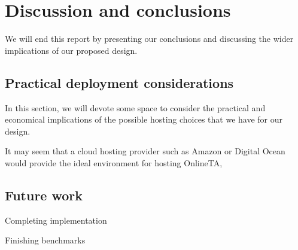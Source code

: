 \chapter{Discussion and conclusions}
We will end this report by presenting our conclusions and discussing
the wider implications of our proposed design.

\section{Practical deployment considerations}
In this section, we will devote some space to consider the practical
and economical implications of the possible hosting choices that we
have for our design.

It may seem that a cloud hosting provider such as Amazon or Digital
Ocean would provide the ideal environment for hosting OnlineTA,

\section{Future work}
Completing implementation

Finishing benchmarks





